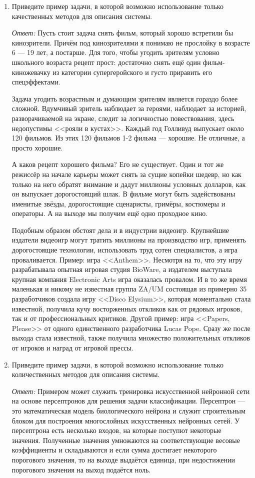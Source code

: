 \documentclass[10pt]{article}
\begin{document}
\begin{enumerate}
\item{Приведите пример задачи, в которой возможно использование только качественных методов для описания системы.}

  \emph{Ответ:} Пусть стоит задача снять фильм, который хорошо встретили бы кинозрители. Причём под кинозрителями я понимаю не прослойку в возрасте 6 --- 19 лет, а постарше. Для того, чтобы угодить зрителям условно школьного возраста рецепт прост: достаточно снять ещё один фильм-киножевачку из категории супергеройского и густо приравить его спецэффектами.

  Задача угодить возрастным и думающим зрителям является гораздо более сложной. Вдумчивый зритель наблюдает за героями, наблюдает за историей, разворачиваемой на экране, следит за логичностью повествования, здесь недопустимы <<рояли в кустах>>. Каждый год Голливуд выпускает около 120 фильмов. Из этих 120 фильмов 1-2 фильма --- хорошие. Не отличные, а просто хорошие.

  А каков рецепт хорошего фильма? Его не существует. Один и тот же режиссёр на начале карьеры может снять за сущие копейки шедевр, но как только на него обратят внимание и дадут миллионы условных долларов, как он выпускает дорогостоящий шлак. В фильме могут быть задействованы именитые звёзды, дорогостоящие сценаристы, гримёры, костюмеры и операторы. А на выходе мы получим ещё одно проходное кино.

  Подобным образом обстоят дела и в индустрии видеоигр. Крупнейшие издатели видеоигр могут тратить миллионы на производство игр, применять дорогостоящие технологии, использовать труд сотен специалистов, а игра проваливается. Пример: игра <<Anthem>>. Несмотря на то, что эту игру разрабатывала опытная игровая студия BioWare, а издателем выступала крупная компания Electronic Arts игра оказалась провалом. И в то же время маленькая и никому не известная группа ZA/UM состоящая из примерно 35 разработчиков создала игру <<Disco Elysium>>, которая моментально стала известной, получила кучу восторженных откликов как от рядовых игроков, так и от профессиональных критиков. Другой пример: игра <<Papers, Please>> от одного единственного разработчика Lucas Pope. Сразу же после выхода стала известной, также получила множество положительных откликов от игроков и наград от игровой прессы.

\item{Приведите пример задачи, в которой возможно использование только количественных методов для описания системы.}

  \emph{Ответ:} Примером может служить тренировка искусственной нейронной сети на основе персептронов для решения задачи классификации. Персептрон --- это математическая модель биологического нейрона и служит строительным блоком для построения многослойных искусственных нейронных сетей. У персептрона есть несколько входов, на которые поступют некоторые значения. Полученные значения умножаются на соответствующие весовые коэффициенты и складываются и если сумма достигает некоторого порогового значения, то на выходе выдаётся единица, при недостижении порогового значения на выход подаётся ноль.


\end{enumerate}
\end{document}
